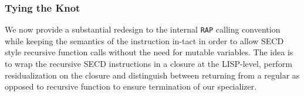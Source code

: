 \documentclass{article}
\theoremstyle{definition}
\newcommand{\mslang}{$\lambda_{\uparrow\downarrow}$}
\begin{document}




\subsubsection{Tying the Knot}\label{ssubsec:knot}
We now provide a substantial redesign to the internal \texttt{RAP} calling convention while keeping the semantics of the instruction in-tact in order to allow SECD style recursive function calls without the need for mutable variables. The idea is to wrap the recursive SECD instructions in a closure at the LISP-level, perform residualization on the closure and distinguish between returning from a regular as opposed to recursive function to ensure termination of our specializer.


\end{document}
